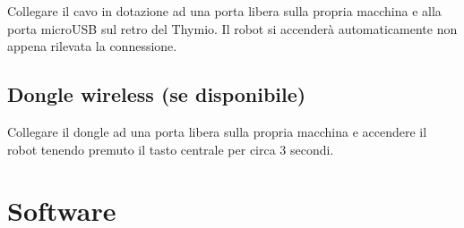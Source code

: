 \documentclass[12pt]{article}
\begin{document}
		Collegare il cavo in dotazione ad una porta libera sulla propria macchina e alla porta microUSB sul retro del Thymio. Il robot si accenderà automaticamente non appena rilevata la connessione.
		
	\subsection{Dongle wireless (se disponibile)}
	
		Collegare il dongle ad una porta libera sulla propria macchina e accendere il robot tenendo premuto il tasto centrale per circa 3 secondi.
	

\section{Software}
\end{document}
